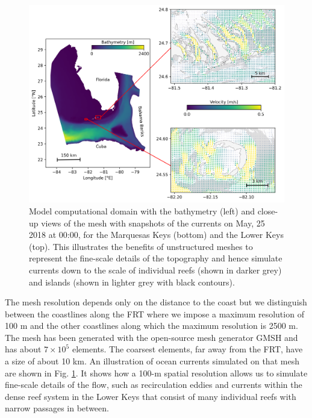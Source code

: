 \documentclass[utf8]{frontiersSCNS}
\begin{document}
\begin{figure}
    \centering
    \includegraphics[width=.9\textwidth]{figures/setup_3.png}
    \caption{Model computational domain with the bathymetry (left) and close-up views of the mesh with snapshots of the currents on May, 25 2018 at 00:00, for the Marquesas Keys (bottom) and the Lower Keys (top). This illustrates the benefits of unstructured meshes to represent the fine-scale details of the topography and hence simulate currents down to the scale of individual reefs (shown in darker grey) and islands (shown in lighter grey with black contours).}
    \label{fig:setup}
\end{figure}

The mesh resolution depends only on the distance to the coast but we distinguish between the coastlines along the FRT where we impose a maximum resolution of 100 m and the other coastlines along which the maximum resolution is 2500 m. The mesh has been generated with the open-source mesh generator GMSH \citep{Geuzaine2009} and has about $7 \times 10^5$ elements. The coarsest elements, far away from the FRT, have a size of about 10 km. An illustration of ocean currents simulated on that mesh are shown in Fig. \ref{fig:setup}. It shows how a 100-m spatial resolution allows us to simulate fine-scale details of the flow, such as recirculation eddies and currents within the dense reef system in the Lower Keys that consist of many individual reefs with narrow passages in between. 
\end{document}
